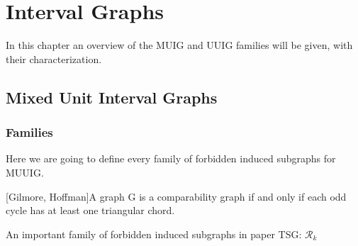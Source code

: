 \chapter{Interval Graphs}

In this chapter an overview of the MUIG and UUIG families will be given, with their characterization.


\section{Mixed Unit Interval Graphs}
\label{sec:muig}


\subsection{Families}

Here we are going to define every family of forbidden induced subgraphs for MUUIG.

\theorem\label{compaTriangular}[Gilmore, Hoffman]{A graph G is a comparability graph if and only if each odd cycle has at least one triangular chord. \cite{gilmoreCharacterizationComparabilityGraphs1964}}

An important family of forbidden induced subgraphs in paper TSG: $\mathcal{R}_k$


